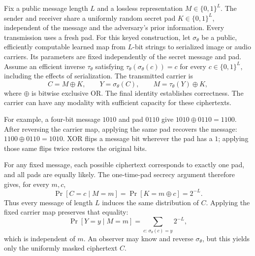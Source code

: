 \documentclass[10pt]{article}
\begin{document}
Fix a public message length $L$ and a lossless representation
$M\in\{0,1\}^L$. The sender and receiver share a uniformly random secret pad
$K\in\{0,1\}^L$, independent of the message and the adversary's prior information.
Every transmission uses a fresh pad. For this keyed construction, let
$\sigma_\theta$ be a public, efficiently
computable learned map from $L$-bit strings to serialized image or audio
carriers. Its parameters are fixed independently of the secret message and pad.
Assume an efficient inverse $\tau_\theta$ satisfying
$\tau_\theta(\sigma_\theta(c))=c$ for every $c\in\{0,1\}^L$, including the effects of
serialization. The transmitted carrier is
\begin{equation}
 C=M\oplus K,\qquad Y=\sigma_\theta(C),\qquad
 M=\tau_\theta(Y)\oplus K,
 \label{eq:pad-carrier}
\end{equation}
where $\oplus$ is bitwise exclusive OR. The final identity establishes correctness.
The carrier can have any modality with sufficient capacity for these ciphertexts.

For example, a four-bit message $1010$ and pad $0110$ give
$1010\oplus0110=1100$. After reversing the carrier map, applying the same pad
recovers the message: $1100\oplus0110=1010$. XOR flips a message bit wherever
the pad has a $1$; applying those same flips twice restores the original bits.

For any fixed message, each possible ciphertext corresponds to exactly one
pad, and all pads are equally likely. The one-time-pad secrecy argument
\cite{shannon} therefore gives, for every $m,c$,
\begin{equation}
 \Pr[C=c\mid M=m]=\Pr[K=m\oplus c]=2^{-L}.
\end{equation}
Thus every message of length $L$ induces the same distribution of $C$. Applying
the fixed carrier map preserves that equality:
\begin{equation}
 \Pr[Y=y\mid M=m]
 =\sum_{c:\,\sigma_\theta(c)=y}2^{-L},
 \label{eq:carrier-secrecy}
\end{equation}
which is independent of $m$. An observer may know and reverse $\sigma_\theta$, but
this yields only the uniformly masked ciphertext $C$.
\end{document}
